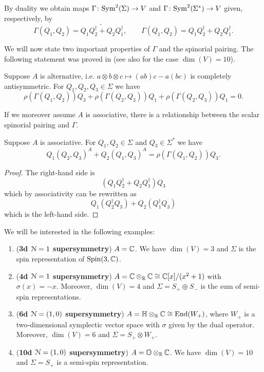 \documentclass[10pt, oneside]{article}
\begin{document}
By duality we obtain maps $\Gamma\colon{\rm Sym}^2(\Sigma)\rightarrow V$ and $\Gamma\colon {\rm Sym}^2(\Sigma^*)\rightarrow V$ given, respectively, by
\[\Gamma(Q_1, Q_2) = \widetilde{Q_1Q_2^\dagger + Q_2Q_1^\dagger},\qquad \Gamma(Q_1, Q_2) = Q_1Q_2^\dagger + Q_2Q_1^\dagger.\]

We will now state two important properties of $\Gamma$ and the spinorial pairing. The following statement was proved in \cite[Theorem 11]{BaezHuerta} (see also \cite{Schray} for the case $\dim(V)=10$).

\begin{thm}
Suppose $A$ is alternative, i.e. $a\otimes b\otimes c\mapsto (ab)c - a(bc)$ is completely antisymmetric. For $Q_1, Q_2, Q_3\in\Sigma$ we have
\[\rho(\Gamma(Q_1, Q_2))Q_3 + \rho(\Gamma(Q_2, Q_3))Q_1 + \rho(\Gamma(Q_2, Q_3))Q_1 = 0.\]
\label{thm:3psi}
\end{thm}

If we moreover assume $A$ is associative, there is a relationship between the scalar spinorial pairing and $\Gamma$.

\begin{thm}
Suppose $A$ is associative. For $Q_1, Q_2\in\Sigma$ and $Q_3\in\Sigma^*$ we have
\[Q_1(Q_2, Q_3)^A + Q_2(Q_1, Q_3)^A = \rho(\Gamma(Q_1, Q_2)) Q_3.\]
\label{thm:matter3psi}
\end{thm}
\begin{proof}
The right-hand side is
\[(Q_1Q_2^\dagger + Q_2Q_1^\dagger)Q_3\]
which by associativity can be rewritten as
\[Q_1(Q_2^\dagger Q_3) + Q_2(Q_1^\dagger Q_3)\]
which is the left-hand side.
\end{proof}

We will be interested in the following examples:
\begin{enumerate}
\item (\textbf{3d $\mathcal{N}=1$ supersymmetry}) $A = \mathbb C$. We have $\dim(V) = 3$ and $\Sigma$ is the spin representation of $\mathrm{Spin}(3, \mathbb C)$.

\item (\textbf{4d $\mathcal{N}=1$ supersymmetry}) $A = \mathbb C\otimes_{\mathbb R}\mathbb C\cong \mathbb C[x]/(x^2+1)$ with $\sigma(x) = -x$. Moreover, $\dim(V) = 4$ and $\Sigma=S_+\oplus S_-$ is the sum of semi-spin representations.

\item (\textbf{6d $\mathcal{N}=(1, 0)$ supersymmetry}) $A=\mathbb{H}\otimes_{\mathbb R}\mathbb C\cong \operatorname{End}(W_+)$, where $W_+$ is a two-dimensional symplectic vector space with $\sigma$ given by the dual operator. Moreover, $\dim(V) = 6$ and $\Sigma = S_+\otimes W_+$.

\item (\textbf{10d $\mathcal{N}=(1, 0)$ supersymmetry}) $A=\mathbb{O}\otimes_{\mathbb R}\mathbb C$. We have $\dim(V) = 10$ and $\Sigma = S_+$ is a semi-spin representation.
\end{enumerate}
\end{document}
